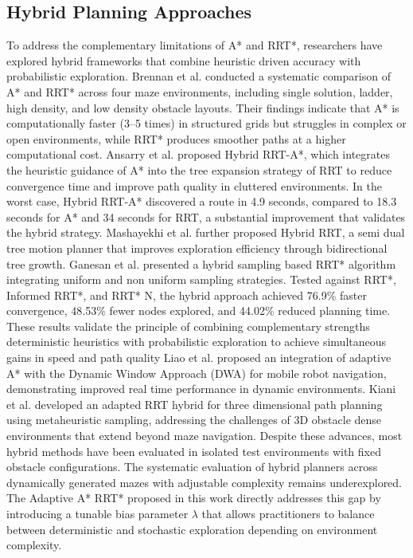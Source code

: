 \documentclass[a4paper,12pt,one side]{report}
\theoremstyle{definition}
\begin{document}
\begin{itemize}
\section{Hybrid Planning Approaches}
To address the complementary limitations of A* and RRT*, researchers have explored hybrid frameworks that combine heuristic driven accuracy with probabilistic exploration. Brennan et al. \cite{brennan2024comparative} conducted a systematic comparison of A* and RRT* across four maze environments, including single solution, ladder, high density, and low density obstacle layouts. Their findings indicate that A* is computationally faster (3–5 times) in structured grids but struggles in complex or open environments, while RRT* produces smoother paths at a higher computational cost.
Ansarry et al.\cite{al2021hybrid} proposed Hybrid RRT-A*, which integrates the heuristic guidance of A* into the tree expansion strategy of RRT to reduce convergence time and improve path quality in cluttered environments. In the worst case, Hybrid RRT-A* discovered a route in 4.9 seconds, compared to 18.3 seconds for A* and 34 seconds for RRT, a substantial improvement that validates the hybrid strategy. Mashayekhi et al. \cite{mashayekhi2020hybrid} further proposed Hybrid RRT, a semi dual tree motion planner that improves exploration efficiency through bidirectional tree growth.
Ganesan et al. \cite{ganesan2024hybrid} presented a hybrid sampling based RRT* algorithm integrating uniform and non uniform sampling strategies. Tested against RRT*, Informed RRT*, and RRT* N, the hybrid approach achieved 76.9\% faster convergence, 48.53\% fewer nodes explored, and 44.02\% reduced planning time. These results validate the principle of combining complementary strengths deterministic heuristics with probabilistic exploration to achieve simultaneous gains in speed and path quality
Liao et al. \cite{liao2024research} proposed an integration of adaptive A* with the Dynamic Window Approach (DWA) for mobile robot navigation, demonstrating improved real time performance in dynamic environments. Kiani et al. \cite{kiani2021adapted} developed an adapted RRT hybrid for three dimensional path planning using metaheuristic sampling, addressing the challenges of 3D obstacle dense environments that extend beyond maze navigation.
Despite these advances, most hybrid methods have been evaluated in isolated test environments with fixed obstacle configurations. The systematic evaluation of hybrid planners across dynamically generated mazes with adjustable complexity remains underexplored. The Adaptive A* RRT* proposed in this work directly addresses this gap by introducing a tunable bias parameter $\lambda$ that allows practitioners to balance between deterministic and stochastic exploration depending on environment complexity.

\end{itemize}
\end{document}

